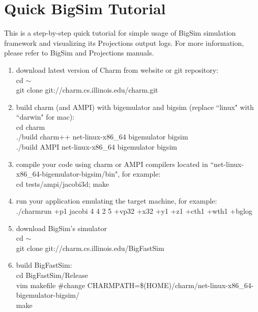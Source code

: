 \section{Quick BigSim Tutorial}
\label{sec:bigtutor}

This is a step-by-step quick tutorial for simple usage of BigSim simulation framework and visualizing its Projections output logs.
For more information, please refer to BigSim and Projections manuals.

\begin{enumerate}

\item download latest version of Charm from website or git repository:\\
        cd $\sim$ \\
        git clone git://charm.cs.illinois.edu/charm.git\\

\item build charm (and AMPI) with bigemulator and bigsim (replace ``linux" with ``darwin" for mac):\\
        cd charm\\
        ./build charm++ net-linux-x86\_64 bigemulator bigsim\\
        ./build AMPI net-linux-x86\_64 bigemulator bigsim\\

\item compile your code using charm or AMPI compilers located in ``net-linux-x86\_64-bigemulator-bigsim/bin", for example:\\
        cd tests/ampi/jacobi3d; make\\

\item run your application emulating the target machine, for example:\\
        ./charmrun +p1 jacobi 4 4 2 5 +vp32 +x32 +y1 +z1 +cth1 +wth1 +bglog\\

\item download BigSim's simulator\\
        cd $\sim$\\
        git clone git://charm.cs.illinois.edu/BigFastSim\\

\item build BigFastSim:\\
        cd BigFastSim/Release\\
        vim makefile  \#change CHARMPATH=\$(HOME)/charm/net-linux-x86\_64-bigemulator-bigsim/\\
        make\\


\end{enumerate}
